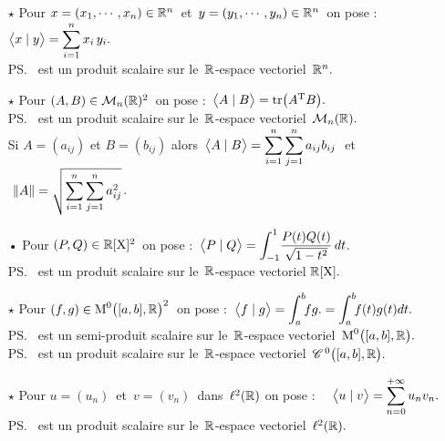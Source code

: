 \begin{itemize}
    \item[$\star$] Pour \(x=(x_1,\cdots,x_n)\in \mathbb{R}^n\,\) et \(\,y=(y_1,\cdots,y_n)\in \mathbb{R}^n\,\) on pose : \(\displaystyle \bigl\langle x\mid y \bigr\rangle=\sum_{i=1}^{n}x_i\,y_i.\)\vspace{-0.2cm}\\
    \ps\, est un produit scalaire sur le \(\,\mathbb{R}\)-espace vectoriel \(\,\mathbb{R}^n.\)\vspace{0.3cm}

    \item[$\star$] Pour \((A,B)\in \mathcal{M}_n(\mathbb{R})^2\,\) on pose : \(\,\bigl\langle A\mid B \bigr\rangle=\text{tr}\bigl(A\textsuperscript{T}B\bigr).\)\vspace{0.1cm}\\
    \ps\, est un produit scalaire sur le $\,\mathbb{R}$-espace vectoriel $\,\mathcal{M}_n(\mathbb{R}).$\vspace{-0.2cm}\\
    Si \(A=(a_{ij})\) et \(B=(b_{ij})\) alors \(\displaystyle \,\bigl\langle A\mid B \bigr\rangle=\sum_{i=1}^{n}\sum_{j=1}^{n}a_{ij}b_{ij}\ \) et \(\ \displaystyle \left\lVert A\right\rVert=\sqrt{\sum_{i=1}^{n}\sum_{j=1}^{n}a_{ij}^2}\).\vspace{0.2cm}

    \item[•] Pour \((P,Q)\in \mathbb{R}[\text{X}]^2\,\) on pose : \(\displaystyle \,\bigl\langle P\mid Q \bigr\rangle=\int_{-1}^{1}\!\frac{P(t)Q(t)}{\sqrt{1-t^2}}\,dt\).\vspace{0.2cm}\\
    \ps\, est un produit scalaire sur le $\,\mathbb{R}$-espace vectoriel \(\mathbb{R}[\text{X}].\)\vspace{0.3cm}

    \item[$\star$] Pour \((f,g)\in \text{M}^0\bigl([a,b],\mathbb{R}\bigr)^2\,\) on pose : \(\displaystyle \,\bigl\langle f\mid g \bigr\rangle=\int_{a}^{b}\!\!fg.=\int_{a}^{b}\!\!f(t)g(t)dt.\) \vspace{0.1cm}\\
    \ps\, est un semi-produit scalaire sur le $\,\mathbb{R}$-espace vectoriel $\,\text{M}^0\bigl([a,b],\mathbb{R}\bigr).$\vspace{0.1cm}\\
    \ps\, est un produit scalaire sur le $\,\mathbb{R}$-espace vectoriel \(\,\mathscr{C}^{\,0}\bigl([a,b],\mathbb{R}\bigr).\)\vspace{0.3cm}

    \item[$\star$] Pour \(u=(u_n)\,\) et \(\,v=(v_n)\,\) dans \(\,\ell^2(\mathbb{R})\) on pose : \(\displaystyle \quad\bigl\langle u\mid v \bigr\rangle=\sum_{n=0}^{+\infty}u_nv_n.\)\\
    \ps\, est un produit scalaire sur le $\,\mathbb{R}$-espace vectoriel \(\,\ell^2(\mathbb{R}).\)
\end{itemize}


